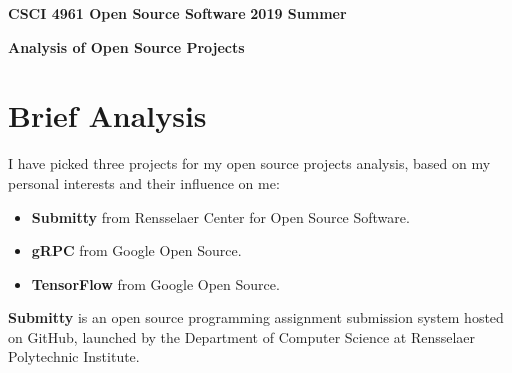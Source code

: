 \documentclass[11pt]{article}
\begin{document}

\begin{center}
\Large \color{orangered} \textbf{CSCI 4961 Open Source Software}
\color{darkorange} \textbf{2019 Summer}
\end{center}

\begin{center}
\Huge \textbf{Analysis of Open Source Projects}
\small {}
\end{center}

\text{\newline \newline\ \newline \newline}

\section*{Brief Analysis}

I have picked three projects for my open source projects analysis, based on my personal interests and their influence on me:
\begin{itemize}
    \item \textbf{Submitty} from Rensselaer Center for Open Source Software.
    \item \textbf{gRPC} from Google Open Source.
    \item \textbf{TensorFlow} from Google Open Source.
\end{itemize}

\textbf{Submitty} is an open source programming assignment submission system hosted on GitHub, launched by the Department of Computer Science at Rensselaer Polytechnic Institute.
\end{document}
